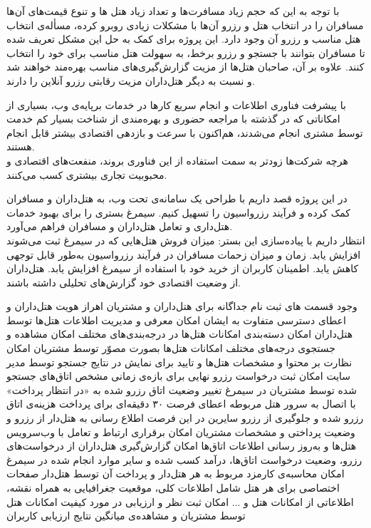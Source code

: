 با توجه به این که حجم زیاد مسافرت‌ها و تعداد زیاد هتل ها و تنوع قیمت‌های آن‌ها مسافران را در انتخاب هتل و رزرو آن‌ها با مشکلات زیادی روبرو کرده، مسأله‌ی انتخاب هتل مناسب و رزرو آن وجود دارد. این پروژه برای کمک به حل این مشکل تعریف شده تا مسافران بتوانند با جستجو و رزرو برخط، به سهولت هتل مناسب برای خود را انتخاب کنند. علاوه بر آن، صاحبان هتل‌ها از مزیت گزارش‌گیری‌های مناسب بهره‌مند خواهند شد و نسبت به دیگر هتل‌داران مزیت رقابتی رزرو آنلاین را دارند.


با پیشرفت فناوری اطلاعات و انجام سریع کارها در خدمات برپایه‌ی وب، بسیاری از امکاناتی که در گذشته با مراجعه حضوری و بهره‌مندی از شناخت بسیار کم خدمت توسط مشتری انجام می‌شدند، هم‌اکنون با سرعت و بازدهی اقتصادی بیشتر قابل انجام هستند.
\\
هرچه شرکت‌ها زودتر به سمت استفاده از این فناوری بروند، منفعت‌های اقتصادی و محبوبیت تجاری بیشتری کسب می‌کنند.

در این پروژه قصد داریم با طراحی یک سامانه‌ی تحت وب، به هتل‌داران و مسافران کمک کرده و فرآیند رزرواسیون را تسهیل کنیم. سیمرغ بستری را برای بهبود خدمات هتل‌داری و تعامل هتل‌داران و مسافران فراهم می‌آورد.
\\
انتظار داریم با پیاده‌سازی این بستر:
 میزان فروش هتل‌هایی که در سیمرغ ثبت می‌شوند افزایش یابد.
 زمان و میزان زحمات مسافران در فرآیند رزرواسیون به‌طور قابل توجهی کاهش یابد.
 اطمینان کاربران از خرید خود با استفاده از سیمرغ افزایش یابد.
 هتل‌داران از وضعیت اقتصادی خود گزارش‌های تحلیلی داشته باشند.

 وجود قسمت های ثبت نام جداگانه برای هتل‌داران و مشتریان
 اهراز هویت هتل‌داران و اعطای دسترسی متفاوت به ایشان
 امکان معرفی و مدیریت اطلاعات هتل‌ها توسط هتل‌داران
 امکان دسته‌بندی امکانات هتل‌ها در درجه‌بندی‌های مختلف
 امکان مشاهده و جستجوی درجه‌های مختلف امکانات هتل‌ها بصورت مصوّر توسط مشتریان
 امکان نظارت بر محتوا و مشخصات هتل‌ها و تایید برای نمایش در نتایج جستجو توسط مدیر سایت
 امکان ثبت درخواست رزرو نهایی برای بازه‌ی زمانی مشخص اتاق‌های جستجو شده توسط مشتریان در سیمرغ
 تغییر وضعیت اتاق رزرو شده به «در انتظار پرداخت» با اتصال به سرور هتل مربوطه
 اعطای فرصت ۳۰ دقیقه‌ای برای پرداخت هزینه‌ی اتاق رزرو شده و جلوگیری از رزرو سایرین در این فرصت
 اطلاع رسانی به هتل‌دار از رزرو و وضعیت پرداختی و مشخصات مشتریان
 امکان برقراری ارتباط و تعامل با وب‌سرویس هتل‌ها و به‌روز رسانی اطلاعات اتاق‌ها
 امکان گزارش‌گیری هتل‌داران از درخواست‌های رزرو، وضعیت درخواست اتاق‌ها، درآمد کسب شده و سایر موارد انجام شده در سیمرغ
 امکان محاسبه‌ی کارمزد مربوط به هر هتل‌دار و پرداخت آن توسط هتل‌دار
 صفحات اختصاصی برای هر هتل شامل اطلاعات کلی، موقعیت جغرافیایی به همراه نقشه، اطلاعاتی از امکانات هتل و ...
 امکان ثبت نظر و ارزیابی در مورد کیفیت امکانات هتل توسط مشتریان و مشاهده‌ی میانگین نتایج ارزیابی کاربران

